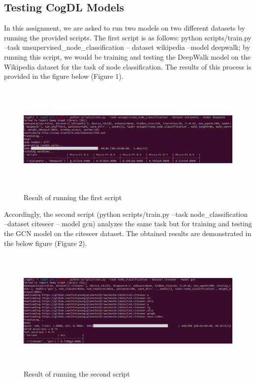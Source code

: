 \documentclass[12pt,a4paper]{article}
\begin{document}
	\subsection{Testing CogDL Models}
	
	\noindent In this assignment, we are asked to run two models on two different datasets by running the provided scripts. The first script is as follows: python scripts/train.py --task unsupervised\_node\_classification -- dataset wikipedia --model deepwalk; by running this script, we would be training and testing the DeepWalk model on the Wikipedia dataset for the task of node classification. The results of this process is provided in the figure below (Figure 1).
	\begin{figure}[H]
		\centering
		\includegraphics[width=15cm, height=5.5cm]{Figures/cmd1}
		\vspace{-0.7cm}
		\caption{Result of running the first script}
	\end{figure}

	\vspace{-0.4cm}
	\noindent Accordingly, the second script (python scripts/train.py --task node\_classification --dataset citeseer -- model gcn) analyzes the same task but for training and testing the GCN model on the citeseer dataset. The obtained results are demonstrated in the below figure (Figure 2).
	
	\begin{figure}[H]
		\centering
		\includegraphics[width=15cm, height=6cm]{Figures/cmd2}
		\vspace{-0.7cm}
		\caption{Result of running the second script}
	\end{figure}
	
\end{document}
